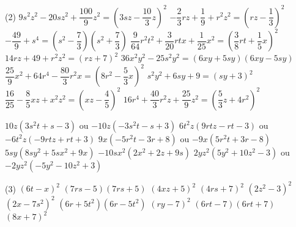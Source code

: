 \documentclass[a4paper,12pt]{report}
\begin{document}
\vspace*{-2\baselineskip}

\begin{core}\phantom{ }

\begin{tasks}(2)
\task $9 s^2 z^2-20 s z^2 + {{\dfrac{100}{9} z^2}}={{\left(3 s z-\dfrac{10}{3} z\right)^2}}$
\task $-\dfrac{2}{3} r z + \dfrac{1}{9}  + {{r^2 z^2}}={{\left(r z-\dfrac{1}{3} \right)^2}}$
\task $-\dfrac{49}{9}  + {{s^4}}={{\left(s^2- \dfrac{7}{3} \right)\left(s^2+\dfrac{7}{3} \right)}}$
\task $\dfrac{9}{64} r^2 t^2 + \dfrac{3}{20} r t x + {{\dfrac{1}{25} x^2}}={{\left(\dfrac{3}{8} r t+\dfrac{1}{5} x\right)^2}}$
\task $14 r z + 49  + {{r^2 z^2}}={{\left(r z+7 \right)^2}}$
\task $36 x^2 y^2- {{25 s^2 y^2}}={{\left(6 x y+ 5 s y\right)\left(6 x y-5 s y\right)}}$
\task $\dfrac{25}{9} x^2 + 64 r^4- {{\dfrac{80}{3} r^2 x}}={{\left(8 r^2-\dfrac{5}{3} x\right)^2}}$
\task $s^2 y^2 + 6 s y + {{9 }}={{\left(s y+3 \right)^2}}$
\task $\dfrac{16}{25} -\dfrac{8}{5} x z + {{x^2 z^2}}={{\left(x z-\dfrac{4}{5} \right)^2}}$
\task $16 r^4 + \dfrac{40}{3} r^2 z + {{\dfrac{25}{9} z^2}}={{\left(\dfrac{5}{3} z+4 r^2\right)^2}}$
\end{tasks}

\end{core}



\begin{core}\phantom{ }

\begin{tasks}
\task ${{10 z(3 s^2 t + s-3 )}}$ ou ${{-10 z(-3 s^2 t-s + 3 )}}$
\task ${{6 t^2 z(9 r t z-r t-3 )}}$ ou ${{-6 t^2 z(-9 r t z + r t + 3 )}}$
\task ${{9 x(-5 r^2 t-3 r + 8 )}}$ ou ${{-9 x(5 r^2 t + 3 r-8 )}}$
\task ${{5 s y(8 s y^2 + 5 s x^2 + 9 x)}}$
\task ${{-10 s x^2(2 x^2 + 2 z + 9 s)}}$
\task ${{2 y z^2(5 y^2 + 10 z^2-3 )}}$ ou ${{-2 y z^2(-5 y^2-10 z^2 + 3 )}}$
\end{tasks}

\end{core}

\begin{core}\phantom{ }

\begin{tasks}(3)
\task ${{\left(6 t-x\right)^2}}$
\task ${{\left(7 r s- 5 \right)\left(7 r s+5 \right)}}$
\task ${{\left(4 x z+5 \right)^2}}$
\task ${{\left(4 r s+7 \right)^2}}$
\task ${{\left(2 z^2-3 \right)^2}}$
\task ${{\left(2 x-7 s^2\right)^2}}$
\task ${{\left(6 r+ 5 t^2\right)\left(6 r-5 t^2\right)}}$
\task ${{\left(r y-7 \right)^2}}$
\task ${{\left(6 r t- 7 \right)\left(6 r t+7 \right)}}$
\task ${{\left(8 x+7 \right)^2}}$
\end{tasks}

\end{core}
\end{document}
